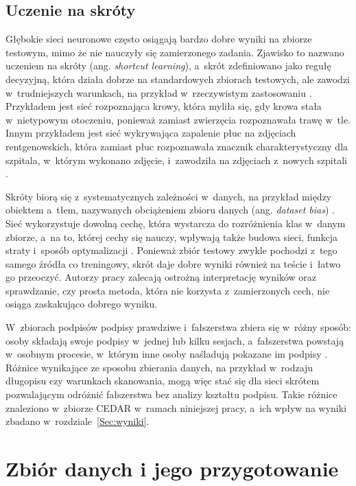 \documentclass[12pt, twoside, openright]{article}
\begin{document}
\subsection{Uczenie na skróty}
\label{Subsec:skroty}

Głębokie sieci neuronowe często osiągają bardzo dobre wyniki na zbiorze testowym, mimo że nie nauczyły się zamierzonego zadania.
Zjawisko to nazwano uczeniem na skróty (ang. \textit{shortcut learning}), a~skrót zdefiniowano jako regułę decyzyjną, która działa dobrze na standardowych zbiorach testowych, ale zawodzi w~trudniejszych warunkach, na przykład w~rzeczywistym zastosowaniu \cite{geirhos2020}.
Przykładem jest sieć rozpoznająca krowy, która myliła się, gdy krowa stała w~nietypowym otoczeniu, ponieważ zamiast zwierzęcia rozpoznawała trawę w~tle.
Innym przykładem jest sieć wykrywająca zapalenie płuc na zdjęciach rentgenowskich, która zamiast płuc rozpoznawała znacznik charakterystyczny dla szpitala, w~którym wykonano zdjęcie, i~zawodziła na zdjęciach z~nowych szpitali \cite{geirhos2020}.

Skróty biorą się z~systematycznych zależności w~danych, na przykład między obiektem a~tłem, nazywanych obciążeniem zbioru danych (ang. \textit{dataset bias}) \cite{geirhos2020}.
Sieć wykorzystuje dowolną cechę, która wystarcza do rozróżnienia klas w~danym zbiorze, a~na to, której cechy się nauczy, wpływają także budowa sieci, funkcja straty i~sposób optymalizacji \cite{geirhos2020}.
Ponieważ zbiór testowy zwykle pochodzi z~tego samego źródła co treningowy, skrót daje dobre wyniki również na teście i~łatwo go przeoczyć.
Autorzy pracy \cite{geirhos2020} zalecają ostrożną interpretację wyników oraz sprawdzanie, czy prosta metoda, która nie korzysta z~zamierzonych cech, nie osiąga zaskakująco dobrego wyniku.

W~zbiorach podpisów podpisy prawdziwe i~fałszerstwa zbiera się w~różny sposób: osoby składają swoje podpisy w~jednej lub kilku sesjach, a~fałszerstwa powstają w~osobnym procesie, w~którym inne osoby naśladują pokazane im podpisy \cite{hafemann2017review}.
Różnice wynikające ze sposobu zbierania danych, na przykład w~rodzaju długopisu czy warunkach skanowania, mogą więc stać się dla sieci skrótem pozwalającym odróżnić fałszerstwa bez analizy kształtu podpisu.
Takie różnice znaleziono w~zbiorze CEDAR w~ramach niniejszej pracy, a~ich wpływ na wyniki zbadano w~rozdziale~\ref{Sec:wyniki}.


\section{Zbiór danych i jego przygotowanie}
\label{Sec:dane}
\end{document}
